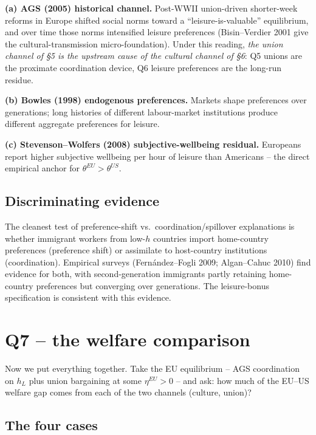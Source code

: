 \documentclass[11pt,a4paper]{article}
\begin{document}
\textbf{(a) AGS (2005) historical channel.} Post-WWII union-driven
shorter-week reforms in Europe shifted social norms toward a
``leisure-is-valuable'' equilibrium, and over time those norms
intensified leisure preferences (Bisin--Verdier 2001 give the
cultural-transmission micro-foundation). Under this reading,
\emph{the union channel of \S 5 is the upstream cause of the cultural
channel of \S 6}: Q5 unions are the proximate coordination device,
Q6 leisure preferences are the long-run residue.

\textbf{(b) Bowles (1998) endogenous preferences.} Markets shape
preferences over generations; long histories of different
labour-market institutions produce different aggregate preferences for
leisure.

\textbf{(c) Stevenson--Wolfers (2008) subjective-wellbeing residual.}
Europeans report higher subjective wellbeing per hour of leisure than
Americans -- the direct empirical anchor for $\theta^{EU}>\theta^{US}$.

\subsection{Discriminating evidence}

The cleanest test of preference-shift vs.\ coordination/spillover
explanations is whether immigrant workers from low-$h$ countries
import home-country preferences (preference shift) or assimilate to
host-country institutions (coordination). Empirical surveys
(Fern\'andez--Fogli 2009; Algan--Cahuc 2010) find evidence for both,
with second-generation immigrants partly retaining home-country
preferences but converging over generations. The leisure-bonus
specification is consistent with this evidence.

\section{Q7 -- the welfare comparison}

Now we put everything together. Take the EU equilibrium -- AGS
coordination on $h_L$ plus union bargaining at some $\eta^{EU}\!>\!0$
-- and ask: how much of the EU--US welfare gap comes from each of the
two channels (culture, union)?

\subsection{The four cases}
\end{document}
